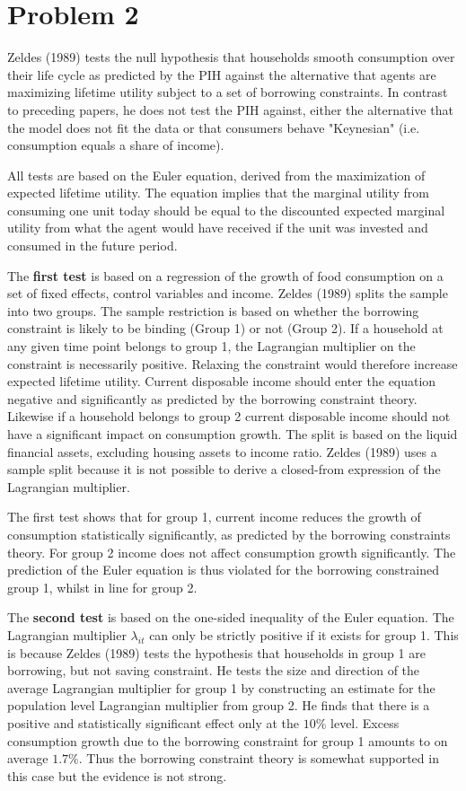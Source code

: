 \documentclass[a4paper, 12pt]{article}
\begin{document}
\section*{Problem 2}

Zeldes (1989) tests the null hypothesis that households smooth consumption over their life cycle as predicted by the PIH against the alternative that agents are maximizing lifetime utility subject to a set of borrowing constraints. In contrast to preceding papers, he does not test the PIH against, either the alternative that the model does not fit the data or that consumers behave "Keynesian" (i.e. consumption equals a share of income).

All tests are based on the Euler equation, derived from the maximization of expected lifetime utility. The equation implies that the marginal utility from consuming one unit today should be equal to the discounted expected marginal utility from what the agent would have received if the unit was invested and consumed in the future period.

The \textbf{first test} is based on a regression of the growth of food consumption on a set of fixed effects, control variables and income. Zeldes (1989) splits the sample into two groups. The sample restriction is based on whether the borrowing constraint is likely to be binding (Group 1) or not (Group 2). If a household at any given time point belongs to group 1, the Lagrangian multiplier on the constraint is necessarily positive. Relaxing the constraint would therefore increase expected lifetime utility. Current disposable income should enter the equation negative and significantly as predicted by the borrowing constraint theory. Likewise if a household belongs to group 2 current disposable income should not have a significant impact on consumption growth. The split is based on the liquid financial assets, excluding housing assets to income ratio. Zeldes (1989) uses a sample split because it is not possible to derive a closed-from expression of the Lagrangian multiplier.

The first test shows that for group 1, current income reduces the growth of consumption statistically significantly, as predicted by the borrowing constraints theory. For group 2 income does not affect consumption growth significantly. The prediction of the Euler equation is thus violated for the borrowing constrained group 1, whilst in line for group 2. 

The \textbf{second test} is based on the one-sided inequality of the Euler equation. The Lagrangian multiplier $\lambda_{it}$ can only be strictly positive if it exists for group 1. This is because Zeldes (1989) tests the hypothesis that households in group 1 are borrowing, but not saving constraint. He tests the size and direction of the average Lagrangian multiplier for group 1 by constructing an estimate for the population level Lagrangian multiplier from group 2. He finds that there is a positive and statistically significant effect only at the $10\%$ level. Excess consumption growth due to the borrowing constraint for group 1 amounts to on average $1.7\%$. Thus the borrowing constraint theory is somewhat supported in this case but the evidence is not strong. 
\end{document}
